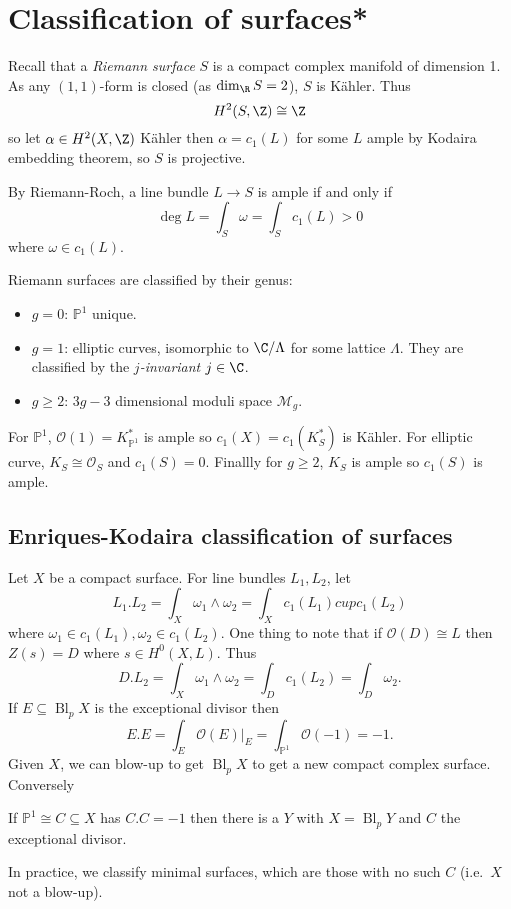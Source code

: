 \documentclass[a4paper]{article}
\renewcommand{\P}{\mathbb P} %
\newcommand{\w}{\wedge} %
\DeclareMathOperator{\Bl}{Bl} %
\begin{document}
\section{Classification of surfaces*}

Recall that a \emph{Riemann surface} \(S\) is a compact complex manifold of dimension 1. As any \((1, 1)\)-form is closed (as \(\dim_\R S = 2\)), \(S\) is Kähler. Thus
\[
  H^2(S, \Z) \cong \Z
\]
so let \(\alpha \in H^2(X, \Z)\) Kähler then \(\alpha = c_1(L)\) for some \(L\) ample by Kodaira embedding theorem, so \(S\) is projective.

By Riemann-Roch, a line bundle \(L \to S\) is ample if and only if
\[
  \deg L = \int_S \omega = \int_S c_1(L) > 0
\]
where \(\omega \in c_1(L)\).

Riemann surfaces are classified by their genus:
\begin{itemize}
\item \(g = 0\): \(\P^1\) unique.
\item \(g = 1\): elliptic curves, isomorphic to \(\C/\Lambda\) for some lattice \(\Lambda\). They are classified by the \emph{\(j\)-invariant} \(j \in \C\).
\item \(g \geq 2\): \(3g - 3\) dimensional moduli space \(\mathcal M_g\).
\end{itemize}

For \(\P^1\), \(\mathcal O(1) = K^*_{\P^1}\) is ample so \(c_1(X) = c_1(K_S^*)\) is Kähler. For elliptic curve, \(K_S \cong \mathcal O_S\) and \(c_1(S) = 0\). Finallly for \(g \geq 2\), \(K_S\) is ample so \(c_1(S)\) is ample.

\subsection{Enriques-Kodaira classification of surfaces}

Let \(X\) be a compact surface. For line bundles \(L_1, L_2\), let
\[
  L_1 . L_2 = \int_X \omega_1 \w \omega_2 = \int_X c_1(L_1) cup c_1(L_2)
\]
where \(\omega_1 \in c_1(L_1), \omega_2 \in c_1(L_2)\). One thing to note that if \(\mathcal O(D) \cong L\) then \(Z(s) = D\) where \(s \in H^0(X, L)\). Thus
\[
  D. L_2 = \int_X \omega_1 \w \omega_2 = \int_D c_1(L_2) = \int_D \omega_2.
\]
If \(E \subseteq \Bl_p X\) is the exceptional divisor then
\[
  E. E = \int_E \mathcal O(E)|_E = \int_{\P^1} \mathcal O(-1) = -1.
\]
Given \(X\), we can blow-up to get \(\Bl_p X\) to get a new compact complex surface. Conversely
\begin{theorem}[Castelnuovo]
  If \(\P^1 \cong C \subseteq X\) has \(C. C = -1\) then there is a \(Y\) with \(X = \Bl_pY\) and \(C\) the exceptional divisor.
\end{theorem}
In practice, we classify minimal surfaces, which are those with no such \(C\) (i.e.\ \(X\) not a blow-up).
\end{document}
